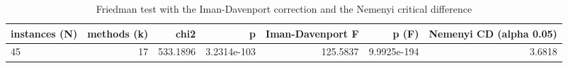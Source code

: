\begin{table}[htbp]
\centering
\small
\caption{Friedman test with the Iman-Davenport correction and the Nemenyi critical difference}
\label{tab:E5_ablation_b10_friedman_test}
\begin{tabular}{lrrrrrr}
\toprule
instances (N) & methods (k) & chi2 & p & Iman-Davenport F & p (F) & Nemenyi CD (alpha 0.05) \\
\midrule
45 & 17 & 533.1896 & 3.2314e-103 & 125.5837 & 9.9925e-194 & 3.6818 \\
\bottomrule
\end{tabular}
\end{table}
